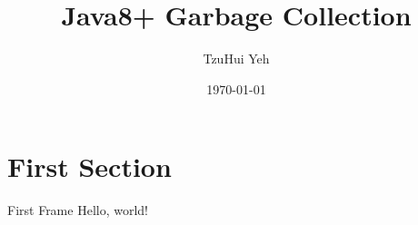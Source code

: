 \documentclass{beamer}
\title{Java8+ Garbage Collection}
\date{\today}
\author{TzuHui Yeh}
\institute{Verizon Media}
\begin{document}
  \maketitle
  \section{First Section}
  \begin{frame}{First Frame}
    Hello, world!
  \end{frame}
\end{document}
